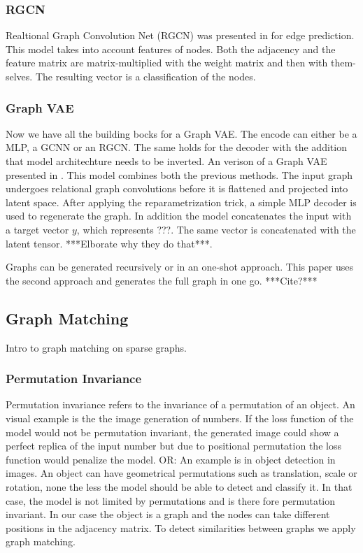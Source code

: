 \subsubsection{RGCN}
Realtional Graph Convolution Net (RGCN) was presented in \cite{kipf_semi-supervised_2017} for edge prediction. This model takes into account features of nodes. Both the adjacency and the feature matrix are matrix-multiplied with the weight matrix and then with them-selves. The resulting vector is a classification of the nodes.
\\
\subsubsection{Graph VAE}
Now we have all the building bocks for a Graph VAE. The encode can either be a MLP, a GCNN or an RGCN. The same holds for the decoder with the addition that model architechture needs to be inverted. An verison of a Graph VAE presented in \cite{simonovsky_graphvae_2018}. This model combines both the previous methods. The input graph undergoes relational graph convolutions before it is flattened and projected into latent space. After applying the reparametrization trick, a simple MLP decoder is used to regenerate the graph. In addition the model concatenates the input with a target vector $y$, which represents ???. The same vector is concatenated with the latent tensor. ***Elborate why they do that***.

Graphs can be generated recursively or in an one-shot approach. This paper uses the second approach and generates the full graph in one go. ***Cite?***

\subsection{Graph Matching}
Intro to graph matching on sparse graphs.

\subsubsection{Permutation Invariance}


Permutation invariance refers to the invariance of a permutation of an object. An visual example is the the image generation of numbers. If the loss function of the model would not be permutation invariant, the generated image could show a perfect replica of the input number but due to positional permutation the loss function would penalize the model. 
OR: An example is in object detection in images. An object can have geometrical permutations such as translation, scale or rotation, none the less the model should be able to detect and classify it. In that case, the model is not limited by permutations and  is there fore permutation invariant.
In our case the object is a graph and the nodes can take different positions in the adjacency matrix. To detect similarities between graphs we apply graph matching.


